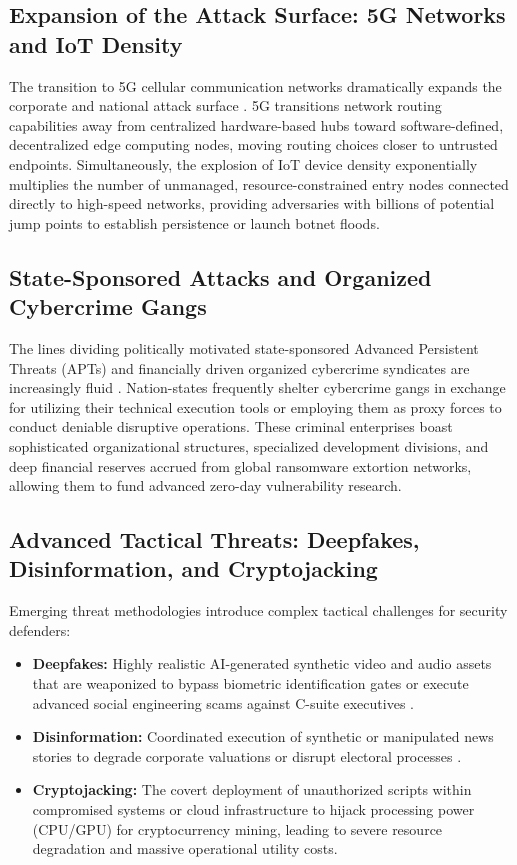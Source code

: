 \documentclass[11pt,a4paper]{article}
\begin{document}
\subsection{Expansion of the Attack Surface: 5G Networks and IoT Density}
The transition to 5G cellular communication networks dramatically expands the corporate and national attack surface \cite{b3}. 5G transitions network routing capabilities away from centralized hardware-based hubs toward software-defined, decentralized edge computing nodes, moving routing choices closer to untrusted endpoints. Simultaneously, the explosion of IoT device density exponentially multiplies the number of unmanaged, resource-constrained entry nodes connected directly to high-speed networks, providing adversaries with billions of potential jump points to establish persistence or launch botnet floods.

\subsection{State-Sponsored Attacks and Organized Cybercrime Gangs}
The lines dividing politically motivated state-sponsored Advanced Persistent Threats (APTs) and financially driven organized cybercrime syndicates are increasingly fluid \cite{b9}. Nation-states frequently shelter cybercrime gangs in exchange for utilizing their technical execution tools or employing them as proxy forces to conduct deniable disruptive operations. These criminal enterprises boast sophisticated organizational structures, specialized development divisions, and deep financial reserves accrued from global ransomware extortion networks, allowing them to fund advanced zero-day vulnerability research.

\subsection{Advanced Tactical Threats: Deepfakes, Disinformation, and Cryptojacking}
Emerging threat methodologies introduce complex tactical challenges for security defenders:
\begin{itemize}
    \item \textbf{Deepfakes:} Highly realistic AI-generated synthetic video and audio assets that are weaponized to bypass biometric identification gates or execute advanced social engineering scams against C-suite executives \cite{b6}.
    \item \textbf{Disinformation:} Coordinated execution of synthetic or manipulated news stories to degrade corporate valuations or disrupt electoral processes \cite{b7}.
    \item \textbf{Cryptojacking:} The covert deployment of unauthorized scripts within compromised systems or cloud infrastructure to hijack processing power (CPU/GPU) for cryptocurrency mining, leading to severe resource degradation and massive operational utility costs.
\end{itemize}
\end{document}
